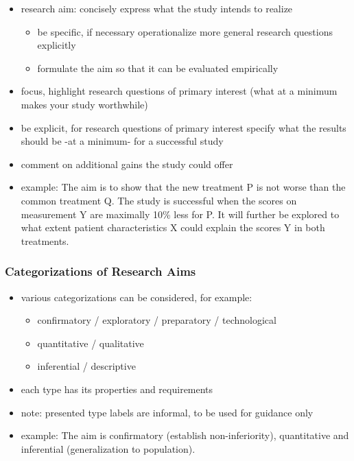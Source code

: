 \documentclass[]{article}
\providecommand{\tightlist}{%
  \setlength{\itemsep}{0pt}\setlength{\parskip}{0pt}}
\begin{document}
\begin{itemize}
\tightlist
\item
  research aim: concisely express what the study intends to realize

  \begin{itemize}
  \tightlist
  \item
    be specific, if necessary operationalize more general research
    questions explicitly
  \item
    formulate the aim so that it can be evaluated empirically \\
  \end{itemize}
\item
  focus, highlight research questions of primary interest (what at a
  minimum makes your study worthwhile)
\item
  be explicit, for research questions of primary interest specify what
  the results should be -at a minimum- for a successful study
\item
  comment on additional gains the study could offer \\
\item
  example: The aim is to show that the new treatment P is not worse than
  the common treatment Q. The study is successful when the scores on
  measurement Y are maximally 10\% less for P. It will further be
  explored to what extent patient characteristics X could explain the
  scores Y in both treatments.
\end{itemize}

\subsubsection{Categorizations of Research
Aims}\label{categorizations-of-research-aims}

\begin{itemize}
\tightlist
\item
  various categorizations can be considered, for example:

  \begin{itemize}
  \tightlist
  \item
    confirmatory / exploratory / preparatory / technological
  \item
    quantitative / qualitative
  \item
    inferential / descriptive \\
  \end{itemize}
\item
  each type has its properties and requirements
\item
  note: presented type labels are informal, to be used for guidance only
\item
  example: The aim is confirmatory (establish non-inferiority),
  quantitative and inferential (generalization to population).
\end{itemize}
\end{document}
